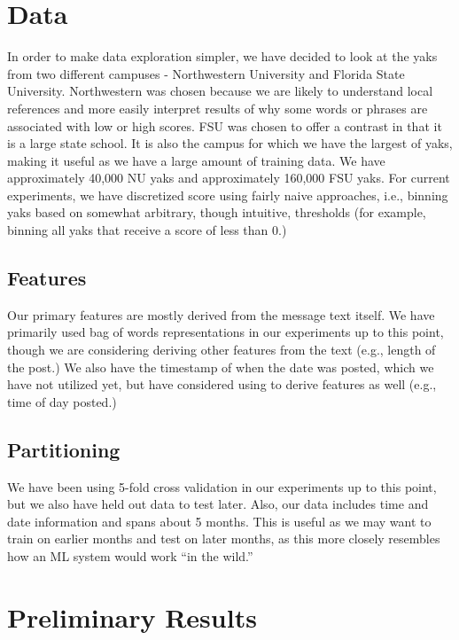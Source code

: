\documentclass{sigchi}
\begin{document}
\section{Data}

In order to make data exploration simpler, we have decided to look at the yaks
from two different campuses - Northwestern University and Florida State
University. Northwestern was chosen because we are likely to understand local
references and more easily interpret results of why some words or phrases are
associated with low or high scores. FSU was chosen to offer a contrast in that
it is a large state school. It is also the campus for which we have the largest of
yaks, making it useful as we have a large amount of training data. We have
approximately 40,000 NU yaks and approximately 160,000 FSU yaks. For current
experiments, we have discretized score using fairly naive approaches, i.e.,
binning yaks based on somewhat arbitrary, though intuitive, thresholds (for
example, binning all yaks that receive a score of less than 0.)

\subsection{Features}

Our primary features are mostly derived from the message text itself. We have primarily
used bag of words representations in our experiments up to this point, though
we are considering deriving other features from the text (e.g., length of the
post.) We also have the timestamp of when the date was posted, which we have not
utilized yet, but have considered using to derive features as well (e.g., time
of day posted.)

\subsection{Partitioning}

We have been using 5-fold cross validation in our experiments up to this point,
but we also have held out data to test later. Also, our data includes time and
date information and spans about 5 months. This is useful as we may want to
train on earlier months and test on later months, as this more closely resembles
how an ML system would work ``in the wild.''

\section{Preliminary Results}
\end{document}
